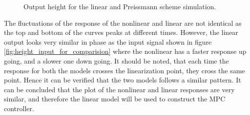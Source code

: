 \begin{figure}[H]
 \centering
 
\caption{Output height for the linear and Preissmann scheme simulation.}
\label{fig:height_output_nonlinear_and_linear_model}
\end{figure}
 


 The fluctuations of the response of the nonlinear and linear are not identical as the top and bottom of the curves peaks at different times. However, the linear output looks very similar in phase as the input signal shown in figure \ref{fig:height_input_for_comparision} where the nonlinear has a faster response up going, and a slower one down going. It should be noted, that each time the response for both the models crosses the linearization point, they cross the same point. Hence it can be verified that the two models follows a similar pattern. It can be concluded that the plot of the nonlinear and linear responses are very similar, and therefore the linear model will be used to construct the MPC controller.  
